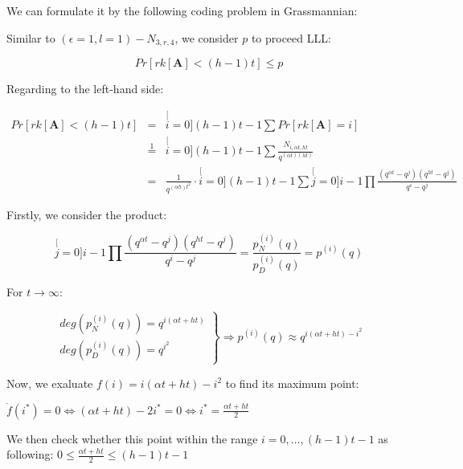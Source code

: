 We can formulate it by the following coding problem in Grassmannian:

\noindent{}

Similar to $\left(\epsilon=1,l=1\right)-\ensuremath{N}_{3,r,4}$,
we consider $p$ to proceed LLL:

\[
Pr\left[rk\left[\boldsymbol{A}\right]<(h-1)t\right]\leq p
\]

Regarding to the left-hand side:

\begin{eqnarray}
Pr\left[rk\left[\boldsymbol{A}\right]<(h-1)t\right] & = & \stackrel[i=0]{(h-1)t-1}{\mathop{\sum}}Pr\left[rk\left[\boldsymbol{A}\right]=i\right]\nonumber \\
 & \overset{1}{=} & \stackrel[i=0]{(h-1)t-1}{\mathop{\sum}}\frac{N_{i,\alpha t,ht}}{q^{\left(\alpha t\right)\left(ht\right)}}\nonumber \\
 & = & \frac{1}{q^{\left(\alpha h\right)t^{2}}}\cdot\stackrel[i=0]{(h-1)t-1}{\mathop{\sum}}\stackrel[j=0]{i-1}{\mathop{\prod}}\frac{\left(q^{\alpha t}-q^{j}\right)\left(q^{ht}-q^{j}\right)}{q^{i}-q^{j}}\label{eq:general_nw_calc_p}
\end{eqnarray}

Firstly, we consider the product:

\[
\stackrel[j=0]{i-1}{\mathop{\prod}}\frac{\left(q^{\alpha t}-q^{j}\right)\left(q^{ht}-q^{j}\right)}{q^{i}-q^{j}}=\frac{p_{N}^{(i)}(q)}{p_{D}^{(i)}(q)}=p^{(i)}(q)
\]

For $t\rightarrow\infty$:

\[
\left.\begin{array}{c}
deg\left(p_{N}^{(i)}(q)\right)=q^{i(\alpha t+ht)}\\
deg\left(p_{D}^{(i)}(q)\right)=q^{i^{2}}
\end{array}\right\} \Rightarrow p^{(i)}(q)\approx q^{i(\alpha t+ht)-i^{2}}
\]

Now, we exaluate $f(i)=i(\alpha t+ht)-i^{2}$ to find its maximum
point:

$\dot{f}(i^{*})=0\Leftrightarrow(\alpha t+ht)-2i^{*}=0\Leftrightarrow i^{*}=\frac{\alpha t+ht}{2}$

We then check whether this point within the range $i=0,\ldots,(h-1)t-1$
as following: $0\leq\frac{\alpha t+ht}{2}\leq(h-1)t-1$

